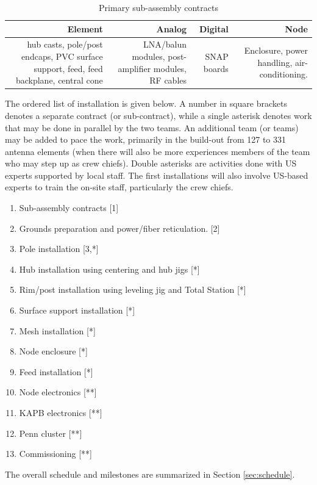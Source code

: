\documentclass[preprint]{aastex}
\begin{document}
\begin{table}[tbh]
\centering
\caption{Primary sub-assembly contracts} \label{tab:subassycontracts}
\begin{tabular}{| r{1.4in} | r{1.4in} | r{1.4in} | r{1.4in} |}\hline
\textbf{Element} & \textbf{Analog} & \textbf{Digital} & \textbf{Node} \tabularnewline \hline
hub casts, pole/post endcaps, PVC surface support, feed, feed backplane, central cone &
LNA/balun modules, post-amplifier modules, RF cables &
SNAP boards &
Enclosure, power handling, air-conditioning. \tabularnewline \hline
\end{tabular}
\end{table}

The ordered list of installation is given below. A number in square brackets denotes
a separate contract (or sub-contract), while a single asterisk denotes work that may
be done in parallel by the two teams. An additional team (or teams) may be added to
pace the work, primarily in the build-out from 127 to 331 antenna elements (when there will also be more
experiences members of the team who may step up as crew chiefs). Double asterisks are
activities done with US experts supported by local staff. The first installations
will also involve US-based experts to train the on-site staff, particularly the crew
chiefs.
\begin{enumerate}[itemsep=-3pt]
\item Sub-assembly contracts [1]
\item Grounds preparation and power/fiber reticulation. [2]
\item Pole installation [3,*]
\item Hub installation using centering and hub jigs  [*]
\item Rim/post installation using leveling jig and Total Station [*]
\item Surface support installation [*]
\item Mesh installation [*]
\item Node enclosure [*]
\item Feed installation [*]
\item Node electronics [**]
\item KAPB electronics [**]
\item Penn cluster [**]
\item Commissioning [**]
\end{enumerate}
The overall schedule and milestones are summarized in Section \ref{sec:schedule}.
\end{document}
